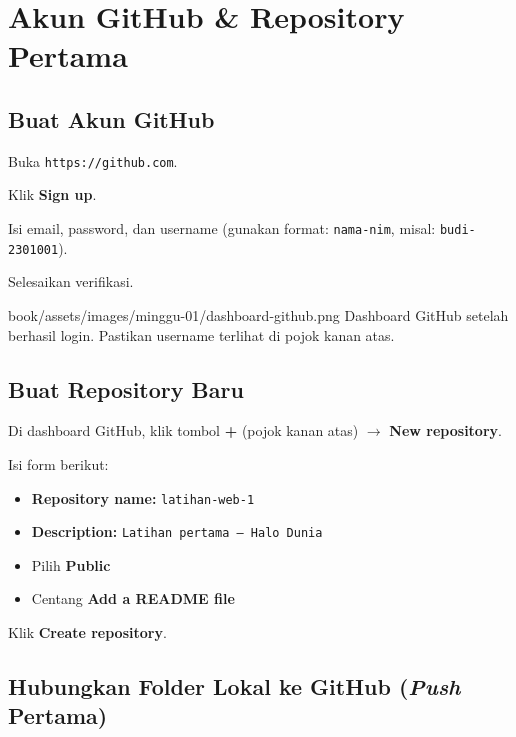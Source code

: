 \section{Akun GitHub \& Repository Pertama}
\label{sec:m01-github}

\subsection{Buat Akun GitHub}

\begin{langkah}
  \item Buka \texttt{https://github.com}.
  \item Klik \textbf{Sign up}.
  \item Isi email, password, dan username (gunakan format: \texttt{nama-nim}, misal: \texttt{budi-2301001}).
  \item Selesaikan verifikasi.
\end{langkah}

\begin{tangkapanlayar}
  {book/assets/images/minggu-01/dashboard-github.png}
  {Dashboard GitHub setelah berhasil login.}
  {Pastikan username terlihat di pojok kanan atas.}
\end{tangkapanlayar}

\subsection{Buat Repository Baru}

\begin{langkah}
  \item Di dashboard GitHub, klik tombol \textbf{+} (pojok kanan atas) $\rightarrow$ \textbf{New repository}.
  \item Isi form berikut:
  \begin{itemize}
    \item \textbf{Repository name:} \texttt{latihan-web-1}
    \item \textbf{Description:} \texttt{Latihan pertama --- Halo Dunia}
    \item Pilih \textbf{Public}
    \item Centang \textbf{Add a README file}
  \end{itemize}
  \item Klik \textbf{Create repository}.
\end{langkah}

\subsection{Hubungkan Folder Lokal ke GitHub (\emph{Push} Pertama)}

